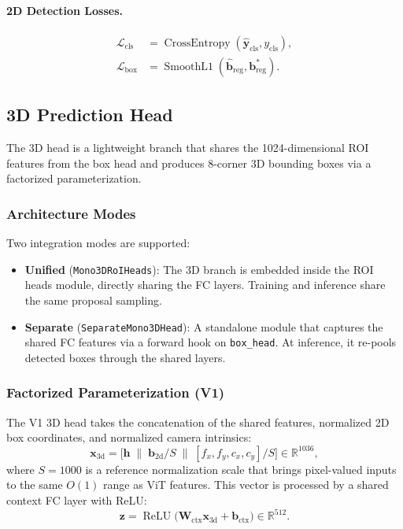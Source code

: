 \documentclass[runningheads]{llncs}
\newcommand{\mR}{\mathbb{R}}
\newcommand{\op}[1]{\operatorname{#1}}
\newcommand{\mat}[1]{\bm{#1}}
\begin{document}
\paragraph{2D Detection Losses.}
\begin{align}
    \mathcal{L}_{\text{cls}} &= \op{CrossEntropy}(\hat{\mat{y}}_{\text{cls}}, y_{\text{cls}}), \label{eq:cls_loss} \\
    \mathcal{L}_{\text{box}} &= \op{SmoothL1}(\hat{\mat{b}}_{\text{reg}}, \mat{b}_{\text{reg}}^*). \label{eq:box_loss}
\end{align}


\subsection{3D Prediction Head}
\label{sec:3d_head}

The 3D head is a lightweight branch that shares the 1024-dimensional ROI features from the box head and produces 8-corner 3D bounding boxes via a factorized parameterization.

\subsubsection{Architecture Modes}
\label{sec:head_modes}

Two integration modes are supported:
\begin{itemize}
    \item \textbf{Unified} (\texttt{Mono3DRoIHeads}): The 3D branch is embedded inside the ROI heads module, directly sharing the FC layers. Training and inference share the same proposal sampling.
    \item \textbf{Separate} (\texttt{SeparateMono3DHead}): A standalone module that captures the shared FC features via a forward hook on \texttt{box\_head}. At inference, it re-pools detected boxes through the shared layers.
\end{itemize}

\subsubsection{Factorized Parameterization (V1)}
\label{sec:3d_v1}

The V1 3D head takes the concatenation of the shared features, normalized 2D box coordinates, and normalized camera intrinsics:
\begin{equation}
    \mat{x}_{\text{3d}} = \bigl[\mat{h} \;\|\; \mat{b}_{\text{2d}} / S \;\|\; [f_x, f_y, c_x, c_y] / S\bigr] \in \mR^{1036},
    \label{eq:3d_input}
\end{equation}
where $S = 1000$ is a reference normalization scale that brings pixel-valued inputs to the same $O(1)$ range as ViT features.  This vector is processed by a shared context FC layer with ReLU:
\begin{equation}
    \mat{z} = \op{ReLU}\bigl(\mat{W}_{\text{ctx}} \mat{x}_{\text{3d}} + \mat{b}_{\text{ctx}}\bigr) \in \mR^{512}.
    \label{eq:context_fc}
\end{equation}
\end{document}
